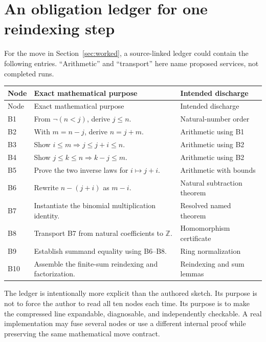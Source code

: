 \documentclass[11pt,a4paper]{article}
\newcommand{\Z}{\mathbb Z}
\theoremstyle{remark}
\begin{document}
\section{An obligation ledger for one reindexing step}
\label{app:ledger}
For the move in Section~\ref{sec:worked}, a source-linked ledger could contain the following entries. ``Arithmetic'' and ``transport'' here name proposed services, not completed runs.
\begin{longtable}{@{}p{}p{}p{}@{}}
\toprule
Node & Exact mathematical purpose & Intended discharge\\
\midrule
\endfirsthead
\toprule Node & Exact mathematical purpose & Intended discharge\\\midrule
\endhead
B1 & From $\neg(n<j)$, derive $j\leq n$. & Natural-number order\\
B2 & With $m=n-j$, derive $n=j+m$. & Arithmetic using B1\\
B3 & Show $i\leq m\Rightarrow j\leq j+i\leq n$. & Arithmetic using B2\\
B4 & Show $j\leq k\leq n\Rightarrow k-j\leq m$. & Arithmetic using B2\\
B5 & Prove the two inverse laws for $i\mapsto j+i$. & Arithmetic with bounds\\
B6 & Rewrite $n-(j+i)$ as $m-i$. & Natural subtraction theorem\\
B7 & Instantiate the binomial multiplication identity. & Resolved named theorem\\
B8 & Transport B7 from natural coefficients to $\Z$. & Homomorphism certificate\\
B9 & Establish summand equality using B6--B8. & Ring normalization\\
B10 & Assemble the finite-sum reindexing and factorization. & Reindexing and sum lemmas\\
\bottomrule
\end{longtable}
The ledger is intentionally more explicit than the authored sketch. Its purpose is not to force the author to read all ten nodes each time. Its purpose is to make the compressed line expandable, diagnosable, and independently checkable. A real implementation may fuse several nodes or use a different internal proof while preserving the same mathematical move contract.

\clearpage
\end{document}
